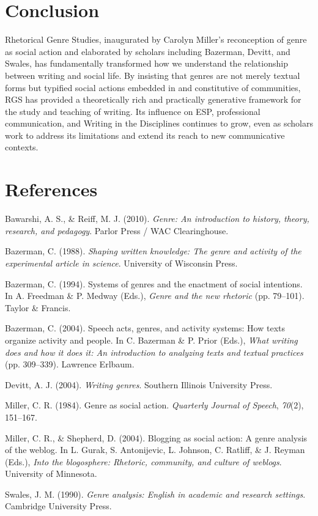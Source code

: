 \documentclass[12pt]{article}
\begin{document}
\section{Conclusion}

Rhetorical Genre Studies, inaugurated by Carolyn Miller's reconception of genre as social action and elaborated by scholars including Bazerman, Devitt, and Swales, has fundamentally transformed how we understand the relationship between writing and social life. By insisting that genres are not merely textual forms but typified social actions embedded in and constitutive of communities, RGS has provided a theoretically rich and practically generative framework for the study and teaching of writing. Its influence on ESP, professional communication, and Writing in the Disciplines continues to grow, even as scholars work to address its limitations and extend its reach to new communicative contexts.

\newpage

\section*{References}

Bawarshi, A. S., \& Reiff, M. J. (2010). \textit{Genre: An introduction to history, theory, research, and pedagogy}. Parlor Press / WAC Clearinghouse.

Bazerman, C. (1988). \textit{Shaping written knowledge: The genre and activity of the experimental article in science}. University of Wisconsin Press.

Bazerman, C. (1994). Systems of genres and the enactment of social intentions. In A. Freedman \& P. Medway (Eds.), \textit{Genre and the new rhetoric} (pp. 79--101). Taylor \& Francis.

Bazerman, C. (2004). Speech acts, genres, and activity systems: How texts organize activity and people. In C. Bazerman \& P. Prior (Eds.), \textit{What writing does and how it does it: An introduction to analyzing texts and textual practices} (pp. 309--339). Lawrence Erlbaum.

Devitt, A. J. (2004). \textit{Writing genres}. Southern Illinois University Press.

Miller, C. R. (1984). Genre as social action. \textit{Quarterly Journal of Speech}, \textit{70}(2), 151--167.

Miller, C. R., \& Shepherd, D. (2004). Blogging as social action: A genre analysis of the weblog. In L. Gurak, S. Antonijevic, L. Johnson, C. Ratliff, \& J. Reyman (Eds.), \textit{Into the blogosphere: Rhetoric, community, and culture of weblogs}. University of Minnesota.

Swales, J. M. (1990). \textit{Genre analysis: English in academic and research settings}. Cambridge University Press.
\end{document}
